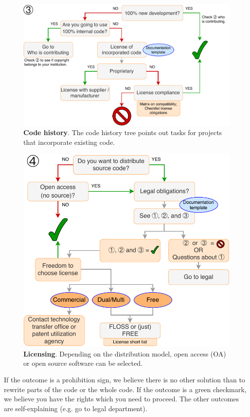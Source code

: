 \documentclass[a4paper,num-refs,numbers,sort&compress]{de-rse}
\begin{document}
\begin{figure}[tb]
  \centering
  \includegraphics[scale=0.5]{tree_new_SW_development}
  \caption{\textbf{Code history}. The code history tree points out tasks for projects that incorporate existing code.}
  \label{fig:tree2}
\end{figure}

\begin{figure}[tb]
  \centering
  \includegraphics[scale=0.5]{tree_licensing}
  \caption{\textbf{Licensing}. Depending on the distribution model, open access (OA) or open source software can be selected.}
  \label{fig:tree3}
\end{figure}


If the outcome is a prohibition sign, we believe there is no other solution than to rewrite parts of the code or the whole code. If the outcome is a green checkmark, we believe you have the rights which you need to proceed. The other outcomes are self-explaining (e.g. go to legal department).
\end{document}
